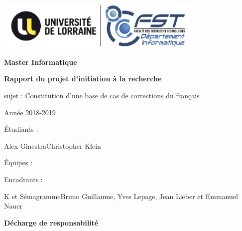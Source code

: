 \documentclass[11pt]{article}
\begin{document}
\begin{center}
\includegraphics[width=10cm]{logoULFST.jpg} %
\end{center}

\begin{center}
\thispagestyle{empty}
{\bfseries \large Master Informatique}
\end{center}

\vspace*{70mm}
\begin{center}
	{\bfseries \Huge Rapport du projet d'initiation \`{a} la recherche}
\end{center}
\vspace*{10mm}
\begin{center}
{\large sujet : Constitution d'une base de cas de corrections du fran\c{c}ais}
\end{center}
\begin{center}
{\large Ann\'ee 2018-2019}
\end{center}



\vspace*{60mm}
\begin{multicols}{2}
\begin{multicols}{2}
	\begin{flushright}
		\'{E}tudiants :
	\end{flushright}
		\vfill\null\columnbreak
	\begin{flushleft}
		Alex Ginestra\newline Christopher Klein
	\end{flushleft}
\end{multicols}
\vfill\null\columnbreak
\begin{multicols}{2}
	\begin{flushright}
		\'{E}quipes :
	\end{flushright}
	\begin{flushright}
		Encadrants :
	\end{flushright}
	\vfill\null\columnbreak
	\begin{flushleft}
	K et S\'emagramme\newline Bruno Guillaume, Yves Lepage, Jean Lieber et Emmanuel Nauer
	\end{flushleft}
\end{multicols}
\end{multicols}
\cleardoublepage
\cleardoublepage
\newpage
\strut
\thispagestyle{empty}
\newpage
\thispagestyle{empty}
\begin{center}
{\bfseries \huge D\'echarge de responsabilit\'e}
\end{center}
\vspace*{10mm}
\end{document}
